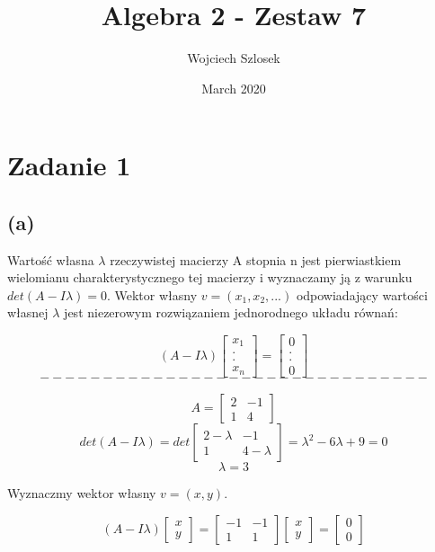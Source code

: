 \documentclass{article}
\title{Algebra 2 - Zestaw 7}
\author{Wojciech Szlosek}
\date{March 2020}
\begin{document}
\maketitle

\section{Zadanie 1}

\subsection{(a)}

Wartość własna $\lambda$ rzeczywistej macierzy A stopnia n jest pierwiastkiem wielomianu charakterystycznego tej macierzy i wyznaczamy ją z warunku $det(A-I\lambda) = 0$. Wektor własny $v = (x_1,x_2,...)$ odpowiadający wartości własnej $\lambda$ jest niezerowym rozwiązaniem jednorodnego układu równań:

$$(A-I\lambda)\left[\begin{array}{c}x_1\\.\\.\\x_n\end{array}\right] = \left[\begin{array}{c}0\\.\\.\\0\end{array}\right]$$
$$-------------------------------$$

$$A = \left[\begin{array}{cc}2&-1\\1 &4\end{array}\right]$$
$$det(A-I\lambda) = det \left[\begin{array}{cc}2-\lambda & -1\\1 & 4-\lambda\end{array}\right] = \lambda^2 -6\lambda + 9 = 0$$
$$\lambda = 3$$ \newline

Wyznaczmy wektor własny $v = (x,y)$.

$$(A-I\lambda)\left[\begin{array}{c}x\\y\end{array}\right] = \left[\begin{array}{cc}-1&-1\\1&1\end{array}\right]\left[\begin{array}{c}x\\y\end{array}\right]=\left[\begin{array}{c}0\\0\end{array}\right]$$
\newline
\end{document}
